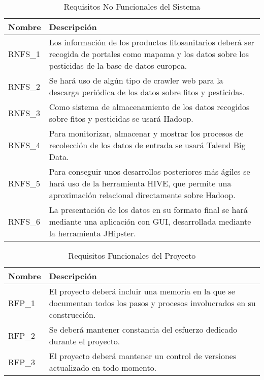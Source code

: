\begin{table}[!h]
\centering
\bgroup
\def\arraystretch{1.3}
\begin{tabular}{l p{13cm}}
\toprule
\textbf{Nombre} & \textbf{Descripción} \\
 \midrule
RNFS\_1 & 
Los información de los productos fitosanitarios deberá ser recogida de portales como mapama y los datos sobre los pesticidas de la base de datos europea.
 \\
RNFS\_2 & 
Se hará uso de algún tipo de crawler web para la descarga periódica de los datos sobre fitos y pesticidas.
 \\
RNFS\_3 & 
Como sistema de almacenamiento de los datos recogidos sobre fitos y pesticidas se usará Hadoop.
 \\
RNFS\_4 & 
Para monitorizar, almacenar y mostrar los procesos de recolección de los datos de entrada se usará Talend Big Data. 
 \\
RNFS\_5 & 
Para conseguir unos desarrollos posteriores más ágiles se hará uso de la herramienta HIVE, que permite una aproximación relacional directamente sobre Hadoop.
 \\
RNFS\_6 & 
La presentación de los datos en su formato final se hará mediante una aplicación con GUI, desarrollada mediante la herramienta JHipster.
 \\
\bottomrule
\end{tabular}
\egroup
\caption{Requisitos No Funcionales del Sistema}
\label{tab:req_no_func_sist}
\end{table}
\begin{table}[!h]
\centering
\bgroup
\def\arraystretch{1.3}
\begin{tabular}{l p{13cm}}
\toprule
\textbf{Nombre} & \textbf{Descripción} \\
 \midrule
RFP\_1 & 
El proyecto deberá incluir una memoria en la que se documentan todos los pasos y procesos involucrados en su construcción.
 \\
RFP\_2 & 
Se deberá mantener constancia del esfuerzo dedicado durante el proyecto.
 \\
RFP\_3 &
El proyecto deberá mantener un control de versiones actualizado en todo momento. 
 \\
\bottomrule
\end{tabular}
\egroup
\caption{Requisitos Funcionales del Proyecto}
\label{tab:req_func_proy}
\end{table}












 


















